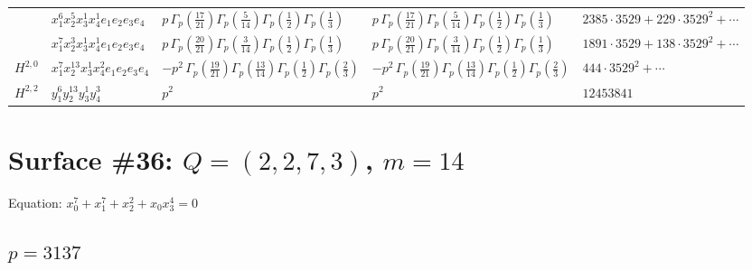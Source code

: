 \documentclass[11pt]{article}
\begin{document}
\begin{table}[ht]
{\begin{tabular}{@{}lllll@{}}
 & $x_{1}^{6} x_{2}^{5} x_{3}^{1} x_{4}^{1}  e_{1} e_{2} e_{3} e_{4}$ & $p \, \Gamma_p \left( \frac{17}{21} \right) \Gamma_p \left( \frac{5}{14} \right) \Gamma_p \left( \frac{1}{2} \right) \Gamma_p \left( \frac{1}{3} \right)$ & $p \, \Gamma_p \left( \frac{17}{21} \right) \Gamma_p \left( \frac{5}{14} \right) \Gamma_p \left( \frac{1}{2} \right) \Gamma_p \left( \frac{1}{3} \right)$ & $2385{\cdot}3529{+}229{\cdot}3529^{2}{+}\cdots$ \\
 & $x_{1}^{7} x_{2}^{3} x_{3}^{1} x_{4}^{1}  e_{1} e_{2} e_{3} e_{4}$ & $p \, \Gamma_p \left( \frac{20}{21} \right) \Gamma_p \left( \frac{3}{14} \right) \Gamma_p \left( \frac{1}{2} \right) \Gamma_p \left( \frac{1}{3} \right)$ & $p \, \Gamma_p \left( \frac{20}{21} \right) \Gamma_p \left( \frac{3}{14} \right) \Gamma_p \left( \frac{1}{2} \right) \Gamma_p \left( \frac{1}{3} \right)$ & $1891{\cdot}3529{+}138{\cdot}3529^{2}{+}\cdots$ \\
\midrule
$H^{2,0}$ & $x_{1}^{7} x_{2}^{13} x_{3}^{1} x_{4}^{2}  e_{1} e_{2} e_{3} e_{4}$ & $- p^{2} \, \Gamma_p \left( \frac{19}{21} \right) \Gamma_p \left( \frac{13}{14} \right) \Gamma_p \left( \frac{1}{2} \right) \Gamma_p \left( \frac{2}{3} \right)$ & $- p^{2} \, \Gamma_p \left( \frac{19}{21} \right) \Gamma_p \left( \frac{13}{14} \right) \Gamma_p \left( \frac{1}{2} \right) \Gamma_p \left( \frac{2}{3} \right)$ & $444{\cdot}3529^{2}{+}\cdots$ \\
\midrule
$H^{2,2}$ & $y_{1}^{6} y_{2}^{13} y_{3}^{1} y_{4}^{3}$ & $p^{2} \,$ & $p^{2} \,$ & $12453841$ \\
\bottomrule
\end{tabular}
}
\renewcommand{\arraystretch}{1.0}
\end{table}

\newpage

\section*{Surface \#36: $Q=(2, 2, 7, 3)$, $m=14$}

Equation: $x_0^{7} + x_1^{7} + x_2^{2} + x_0 x_3^{4} = 0$

\subsection*{$p = 3137$}
\end{document}
